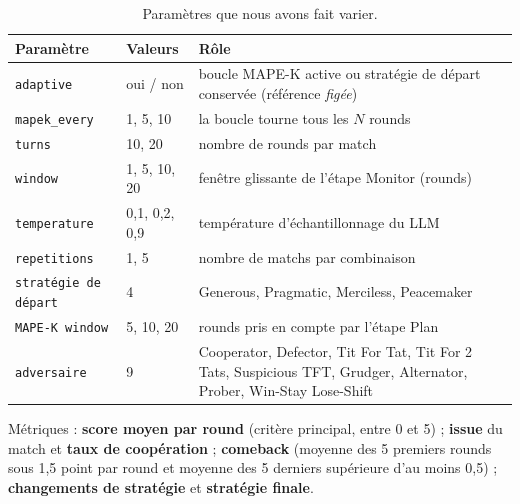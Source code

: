 \documentclass[10pt,a4paper]{article}
\begin{document}
\begin{table}[H]
  \centering\small
  \begin{tabular}{llp{9.3cm}}
    \toprule
    Paramètre                    & Valeurs       & Rôle                                                                                                                \\
    \midrule
    \texttt{adaptive}            & oui / non     & boucle MAPE-K active ou stratégie de départ conservée (référence \emph{figée})                                      \\
    \texttt{mapek\_every}        & 1, 5, 10      & la boucle tourne tous les $N$ rounds                                                                                \\
    \texttt{turns}               & 10, 20        & nombre de rounds par match                                                                                          \\
    \texttt{window}              & 1, 5, 10, 20  & fenêtre glissante de l'étape Monitor (rounds)                                                                       \\
    \texttt{temperature}         & 0,1, 0,2, 0,9 & température d'échantillonnage du LLM                                                                                \\
    \texttt{repetitions}         & 1, 5          & nombre de matchs par combinaison                                                                                    \\
    \texttt{stratégie de départ} & 4             & Generous, Pragmatic, Merciless, Peacemaker                                                                          \\
    \texttt{MAPE-K window}       & 5, 10, 20     & rounds pris en compte par l'étape Plan                                                                              \\
    \texttt{adversaire}          & 9             & Cooperator, Defector, Tit For Tat, Tit For 2 Tats, Suspicious TFT, Grudger, Alternator, Prober, Win-Stay Lose-Shift \\
    \bottomrule
  \end{tabular}
  \caption{Paramètres que nous avons fait varier.}
  \label{tab:parametres}
\end{table}

Métriques : \textbf{score moyen par round} (critère principal, entre 0 et 5) ;
\textbf{issue} du match et \textbf{taux de coopération} ; \textbf{comeback}
(moyenne des 5 premiers rounds sous 1,5 point par round et moyenne des 5 derniers
supérieure d'au moins 0,5) ; \textbf{changements de stratégie} et
\textbf{stratégie finale}.
\end{document}
